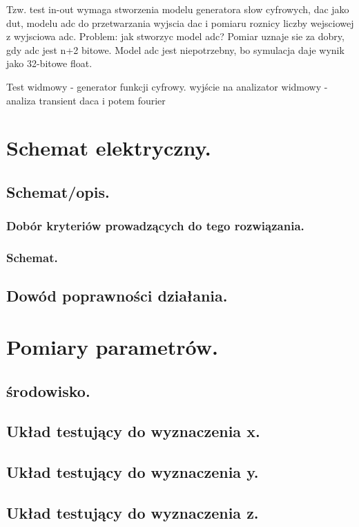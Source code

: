 \documentclass[10pt,a4paper]{report}
\begin{document}
	Tzw. test in-out wymaga stworzenia modelu generatora słow cyfrowych, dac jako dut, modelu adc do przetwarzania wyjscia dac i pomiaru roznicy liczby wejsciowej z wyjsciowa adc. Problem: jak stworzyc model adc? Pomiar uznaje sie za dobry, gdy adc jest n+2 bitowe. Model adc jest niepotrzebny, bo symulacja daje wynik jako 32-bitowe float.
	
	Test widmowy - generator funkcji cyfrowy. wyjście na analizator widmowy - analiza transient daca i potem fourier
	
	
	
	  
	\chapter{Schemat elektryczny.}
	\section{Schemat/opis.}
	\subsection{Dobór kryteriów prowadzących do tego rozwiązania.}
	\subsection{Schemat.}
	\section{Dowód poprawności działania.}

	\chapter{Pomiary parametrów.}
	\section{środowisko.}
	\section{Układ testujący do wyznaczenia x.}
	\section{Układ testujący do wyznaczenia y.}
	\section{Układ testujący do wyznaczenia z.}
	
\end{document}
